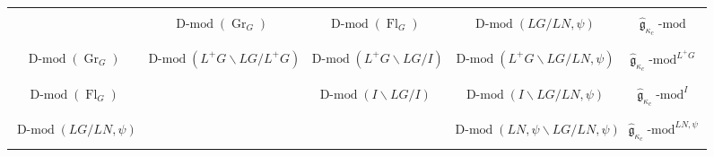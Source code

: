 \documentclass[10pt]{amsart}
\newcommand{\fgc}{\widehat{\fg}_{\kappa_c}}
\newcommand{\fg}{\mathfrak{g}}
\newcommand{\on}{\operatorname}
\renewcommand{\mod}{\on{-mod}}
\newcommand{\Dmod}{\on{D-mod}}
\theoremstyle{remark}
\newcommand{\Gr}{\operatorname{Gr}}
\newcommand{\Fl}{\operatorname{Fl}}
\numberwithin{equation}{section}
\renewcommand{\mod}{\operatorname{-mod}}
\begin{document}
\footnotesize
	
\begin{center}
	\begin{figure}
		
		\setlength{\tabcolsep}{.5em}
		\begin{tabular}{|c |c| c| c| c|}
			
			\hline & &&& \\ & $\Dmod(\Gr_G)$ & $\Dmod(\Fl_G)$ & $\Dmod(LG/LN, \psi)$& 
			$\fgc\mod$  \\ & &&& \\ \hline   & &&& \\$\Dmod(\Gr_G)$  \hspace{0mm}& 
			\hspace{0mm} 
			$\Dmod(L^+G 
			\backslash LG / L^+G)$ \hspace{0mm}& \hspace{0mm} $\Dmod(L^+G 
			\backslash LG / I)$ \hspace{0mm} &  \hspace{0mm}$\Dmod(L^+G 
			\backslash LG / LN, \psi)$ \hspace{0mm}&  
			\hspace{0mm}$\fgc\mod^{L^+G}$  \hspace{0mm}\\  & &&& 
			
			
			\\ \hline   & &&& \\$\Dmod(\Fl_G)$  \hspace{0mm} &  \hspace{0mm} 
			\hspace{0mm} &  \hspace{0mm}$\Dmod(I \backslash LG / I)$ \hspace{0mm} 
			&  \hspace{0mm} 
			$\Dmod(I \backslash LG / LN, \psi)$ \hspace{0mm} &  \hspace{0mm}  
			$\fgc\mod^I$  \hspace{0mm}\\  
			& &&& 
			
			
			
			\\ \hline   & &&& \\ \hspace{0mm}$\Dmod(LG/LN, \psi)$  \hspace{0mm}&& 
			\hspace{0mm} 
			&  
			\hspace{0mm}$\Dmod(LN, \psi \backslash 
			LG / LN, \psi)$ \hspace{0mm} &  \hspace{0mm}  $\fgc\mod^{LN, \psi}$  
			\hspace{0mm}\\  & &&& 
			

\end{tabular}
\end{figure}
\end{center}
\end{document}
